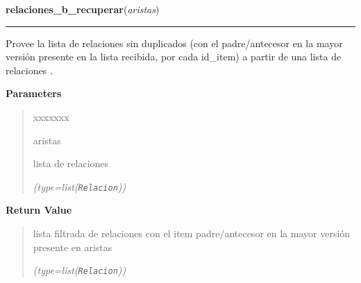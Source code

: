 \hspace{.8\funcindent}\begin{boxedminipage}{\funcwidth}

    \raggedright \textbf{relaciones\_b\_recuperar}(\textit{aristas})

    \vspace{-1.5ex}

    \rule{\textwidth}{0.5\fboxrule}
\setlength{\parskip}{2ex}
    Provee la lista de relaciones sin duplicados (con el padre/antecesor en
    la mayor versión presente en la lista recibida, por cada id\_item) a 
    partir de una lista de relaciones .

\setlength{\parskip}{1ex}
      \textbf{Parameters}
      \vspace{-1ex}

      \begin{quote}
        \begin{Ventry}{xxxxxxx}

          \item[aristas]

          lista de relaciones

            {\it (type=list(\texttt{Relacion}))}

        \end{Ventry}

      \end{quote}

      \textbf{Return Value}
    \vspace{-1ex}

      \begin{quote}
      lista filtrada de relaciones con el item padre/antecesor en la mayor 
      versión presente en aristas

      {\it (type=list(\texttt{Relacion}))}

      \end{quote}

    \end{boxedminipage}

    \label{saip:lib:func:forma_ciclo}

    \vspace{0.5ex}

